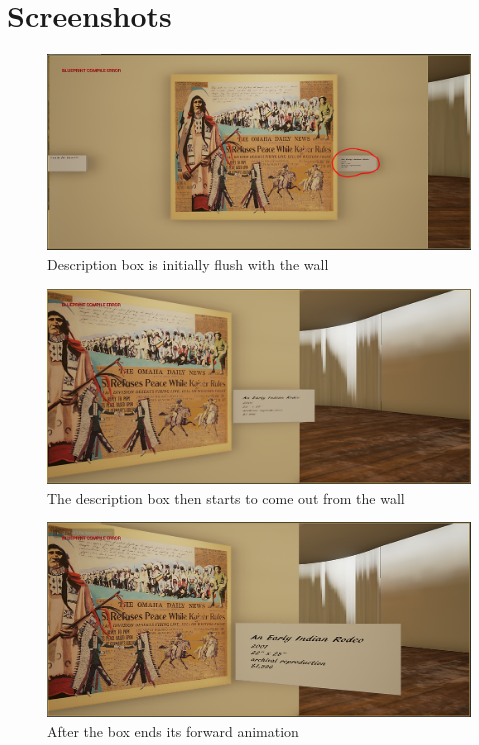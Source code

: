 \documentclass[11pt]{book}
\begin{document}
\section*{Screenshots}
	\begin{figure}
		\caption{Description box is initially flush with the wall}
		\includegraphics[scale=0.5]{Screenshots/Animation1.png}
		\centering
	\end{figure}
	\begin{figure}
		\caption{The description box then starts to come out from the wall}
		\includegraphics[scale=0.5]{Screenshots/Animation2.png}
		\centering
	\end{figure}
	\begin{figure}
		\caption{After the box ends its forward animation}
		\includegraphics[scale=0.5]{Screenshots/Animation3.png}
		\centering
	\end{figure}
\end{document}
